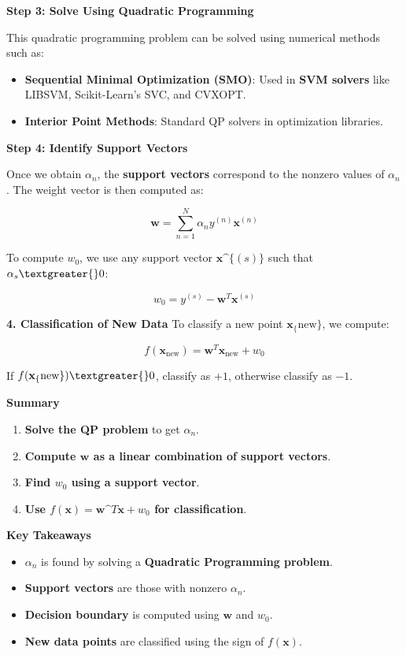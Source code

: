 \documentclass[11pt]{article}
\providecommand{\tightlist}{%
      \setlength{\itemsep}{0pt}\setlength{\parskip}{0pt}}
\begin{document}
\textbf{Step 3: Solve Using Quadratic Programming}

This quadratic programming problem can be solved using numerical methods
such as:

\begin{itemize}
\tightlist
\item
  \textbf{Sequential Minimal Optimization (SMO)}: Used in \textbf{SVM
  solvers} like LIBSVM, Scikit-Learn's SVC, and CVXOPT.
\item
  \textbf{Interior Point Methods}: Standard QP solvers in optimization
  libraries.
\end{itemize}

\textbf{Step 4: Identify Support Vectors}

Once we obtain $ \alpha_n $, the \textbf{support vectors} correspond
to the nonzero values of $ \alpha_n $. The weight vector is then
computed as:

$$
\mathbf{w} = \sum\limits_{n=1}^N \alpha_n y^{(n)} \mathbf{x}^{(n)}
$$

To compute $ w_0 $, we use any support vector $
\mathbf{x}\^{}\{(s)\} $ such that $ \alpha_s \textgreater{} 0 $:

$$
w_0 = y^{(s)} - \mathbf{w}^T \mathbf{x}^{(s)}
$$

    \textbf{4. Classification of New Data} To classify a new point $
\mathbf{x}_\{\text{new}\} $, we compute:

$$
f(\mathbf{x}_{\text{new}}) = \mathbf{w}^T \mathbf{x}_{\text{new}} + w_0
$$

If $ f(\mathbf{x}_\{\text{new}\}) \textgreater{} 0 $, classify as $
+1 $, otherwise classify as $ -1 $.

\textbf{Summary}

\begin{enumerate}
\def\labelenumi{\arabic{enumi}.}
\tightlist
\item
  \textbf{Solve the QP problem} to get $ \alpha_n $.
\item
  \textbf{Compute $ \mathbf{w} $ as a linear combination of support
  vectors}.
\item
  \textbf{Find $ w_0 $ using a support vector}.
\item
  \textbf{Use $ f(\mathbf{x}) = \mathbf{w}\^{}T \mathbf{x} + w_0 $
  for classification}.
\end{enumerate}

\textbf{Key Takeaways}

\begin{itemize}
\tightlist
\item
  $ \alpha_n $ is found by solving a \textbf{Quadratic Programming
  problem}.
\item
  \textbf{Support vectors} are those with nonzero $ \alpha_n $.
\item
  \textbf{Decision boundary} is computed using $ \mathbf{w} $ and $
  w_0 $.
\item
  \textbf{New data points} are classified using the sign of $
  f(\mathbf{x}) $.
\end{itemize}
\end{document}
